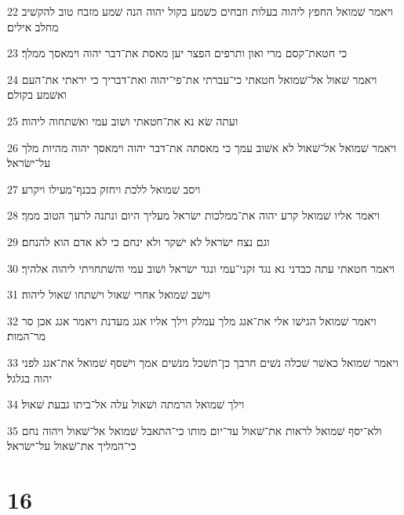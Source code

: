 \par 22 ויאמר שׁמואל החפץ ליהוה בעלות וזבחים כשׁמע בקול יהוה הנה שׁמע מזבח טוב להקשׁיב מחלב אילים׃
\par 23 כי חטאת־קסם מרי ואון ותרפים הפצר יען מאסת את־דבר יהוה וימאסך ממלך׃
\par 24 ויאמר שׁאול אל־שׁמואל חטאתי כי־עברתי את־פי־יהוה ואת־דבריך כי יראתי את־העם ואשׁמע בקולם׃
\par 25 ועתה שׂא נא את־חטאתי ושׁוב עמי ואשׁתחוה ליהוה׃
\par 26 ויאמר שׁמואל אל־שׁאול לא אשׁוב עמך כי מאסתה את־דבר יהוה וימאסך יהוה מהיות מלך על־ישׂראל׃
\par 27 ויסב שׁמואל ללכת ויחזק בכנף־מעילו ויקרע׃
\par 28 ויאמר אליו שׁמואל קרע יהוה את־ממלכות ישׂראל מעליך היום ונתנה לרעך הטוב ממך׃
\par 29 וגם נצח ישׂראל לא ישׁקר ולא ינחם כי לא אדם הוא להנחם׃
\par 30 ויאמר חטאתי עתה כבדני נא נגד זקני־עמי ונגד ישׂראל ושׁוב עמי והשׁתחויתי ליהוה אלהיך׃
\par 31 וישׁב שׁמואל אחרי שׁאול וישׁתחו שׁאול ליהוה׃
\par 32 ויאמר שׁמואל הגישׁו אלי את־אגג מלך עמלק וילך אליו אגג מעדנת ויאמר אגג אכן סר מר־המות׃
\par 33 ויאמר שׁמואל כאשׁר שׁכלה נשׁים חרבך כן־תשׁכל מנשׁים אמך וישׁסף שׁמואל את־אגג לפני יהוה בגלגל׃
\par 34 וילך שׁמואל הרמתה ושׁאול עלה אל־ביתו גבעת שׁאול׃
\par 35 ולא־יסף שׁמואל לראות את־שׁאול עד־יום מותו כי־התאבל שׁמואל אל־שׁאול ויהוה נחם כי־המליך את־שׁאול על־ישׂראל׃

\chapter{16}

